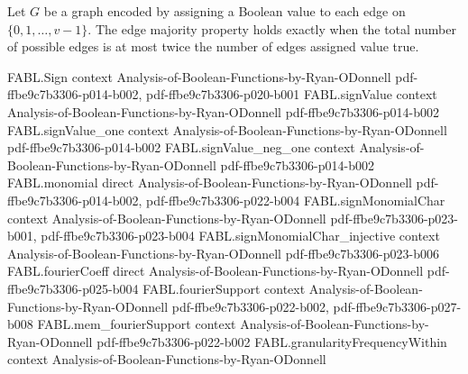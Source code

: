 \begin{definition}
\label{FABL.edgeMajorityGraphProperty}
\leanok
{}
Let $G$ be a graph encoded by assigning a Boolean value to each edge on
$\{0,1,\ldots,v-1\}$. The edge majority property holds exactly when the total number of
possible edges is at most twice the number of edges assigned value true.
\end{definition}

\begin{theorem}
\label{FABL.edgeMajority_isGraphProperty}
\leanok
{}
\proofstep
  {FABL.Sign}
  {context}
  {Analysis-of-Boolean-Functions-by-Ryan-ODonnell}
  {pdf-ffbe9c7b3306-p014-b002,
    pdf-ffbe9c7b3306-p020-b001}
\proofstep
  {FABL.signValue}
  {context}
  {Analysis-of-Boolean-Functions-by-Ryan-ODonnell}
  {pdf-ffbe9c7b3306-p014-b002}
\proofstep
  {FABL.signValue_one}
  {context}
  {Analysis-of-Boolean-Functions-by-Ryan-ODonnell}
  {pdf-ffbe9c7b3306-p014-b002}
\proofstep
  {FABL.signValue_neg_one}
  {context}
  {Analysis-of-Boolean-Functions-by-Ryan-ODonnell}
  {pdf-ffbe9c7b3306-p014-b002}
\proofstep
  {FABL.monomial}
  {direct}
  {Analysis-of-Boolean-Functions-by-Ryan-ODonnell}
  {pdf-ffbe9c7b3306-p014-b002,
    pdf-ffbe9c7b3306-p022-b004}
\proofstep
  {FABL.signMonomialChar}
  {context}
  {Analysis-of-Boolean-Functions-by-Ryan-ODonnell}
  {pdf-ffbe9c7b3306-p023-b001,
    pdf-ffbe9c7b3306-p023-b004}
\proofstep
  {FABL.signMonomialChar_injective}
  {context}
  {Analysis-of-Boolean-Functions-by-Ryan-ODonnell}
  {pdf-ffbe9c7b3306-p023-b006}
\proofstep
  {FABL.fourierCoeff}
  {direct}
  {Analysis-of-Boolean-Functions-by-Ryan-ODonnell}
  {pdf-ffbe9c7b3306-p025-b004}
\proofstep
  {FABL.fourierSupport}
  {context}
  {Analysis-of-Boolean-Functions-by-Ryan-ODonnell}
  {pdf-ffbe9c7b3306-p022-b002,
    pdf-ffbe9c7b3306-p027-b008}
\proofstep
  {FABL.mem_fourierSupport}
  {context}
  {Analysis-of-Boolean-Functions-by-Ryan-ODonnell}
  {pdf-ffbe9c7b3306-p022-b002}
\proofstep
  {FABL.granularityFrequencyWithin}
  {context}
  {Analysis-of-Boolean-Functions-by-Ryan-ODonnell}

\end{theorem}
